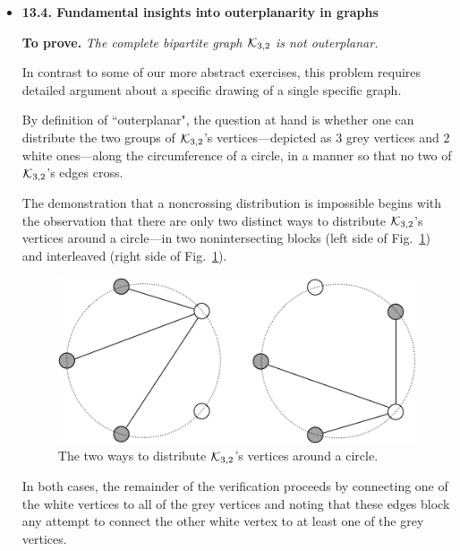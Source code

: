 \begin{itemize}
\medskip\item 
{\bf 13.4. Fundamental insights into outerplanarity in graphs}

\smallskip

{\bf To prove.} {\em The complete bipartite graph $\mbox{$\cal K$}_{3,2}$ is not outerplanar.}

\medskip

In contrast to some of our more abstract exercises, this problem requires detailed argument about a specific drawing of a single specific graph.

\smallskip

By definition of ``outerplanar", the question at hand is whether one can distribute the two groups of $\mbox{$\cal K$}_{3,2}$'s vertices---depicted as $3$ grey vertices and $2$ white ones---along the circumference of a circle, in a manner so that no two of $\mbox{$\cal K$}_{3,2}$'s edges cross.

\smallskip

The demonstration that a noncrossing distribution is impossible begins with the observation that there are only two distinct ways to distribute $\mbox{$\cal K$}_{3,2}$'s vertices around a circle---in two nonintersecting blocks (left side of Fig.~\ref{fig:outerplanarK32}) and interleaved (right side of Fig.~\ref{fig:outerplanarK32}).
\begin{figure}[h]
\begin{center}
        \includegraphics[scale=0.3]{FiguresGraph/outerplanarK3,2}
        \caption{The two ways to distribute $\mbox{$\cal K$}_{3,2}$'s vertices around a circle.}
        \label{fig:outerplanarK32}
\end{center}
\end{figure}
In both cases, the remainder of the verification proceeds by connecting one of the white vertices to all of the grey vertices and noting that these edges block any attempt to connect the other white vertex to at least one of the grey vertices.

\end{itemize}


